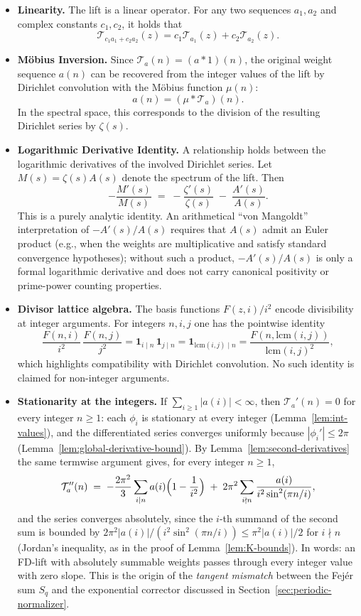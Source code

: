 \begin{itemize}
    \item \textbf{Linearity.} The lift is a linear operator. For any two sequences $a_1, a_2$ and complex constants $c_1, c_2$, it holds that
    \[ \mathcal{T}_{c_1 a_1 + c_2 a_2}(z) = c_1 \mathcal{T}_{a_1}(z) + c_2 \mathcal{T}_{a_2}(z). \]

    \item \textbf{M\"obius Inversion.} Since $\mathcal{T}_a(n) = (a*1)(n)$, the original weight sequence $a(n)$ can be recovered from the integer values of the lift by Dirichlet convolution with the M\"obius function $\mu(n)$:
    \[ a(n) = (\mu * \mathcal{T}_a)(n). \]
    In the spectral space, this corresponds to the division of the resulting Dirichlet series by $\zeta(s)$.

    \item \textbf{Logarithmic Derivative Identity.} A relationship holds between the logarithmic derivatives of the involved Dirichlet series. Let $M(s)=\zeta(s)A(s)$ denote the spectrum of the lift. Then
    \[
    -\frac{M'(s)}{M(s)} \;=\; -\frac{\zeta'(s)}{\zeta(s)} \;-\; \frac{A'(s)}{A(s)}.
    \]
    This is a purely analytic identity. An arithmetical “von Mangoldt” interpretation of $-A'(s)/A(s)$ requires that $A(s)$ admit an Euler product (e.g., when the weights are multiplicative and satisfy standard convergence hypotheses); without such a product, $-A'(s)/A(s)$ is only a formal logarithmic derivative and does not carry canonical positivity or prime-power counting properties.

    \item \textbf{Divisor lattice algebra.} The basis functions $F(z,i)/i^2$ encode divisibility at integer arguments. For integers $n,i,j$ one has the pointwise identity
    \[
    \frac{F(n,i)}{i^2}\,\frac{F(n,j)}{j^2}=\mathbf{1}_{i\mid n}\,\mathbf{1}_{j\mid n}=\mathbf{1}_{\mathrm{lcm}(i,j)\mid n}=\frac{F(n,\mathrm{lcm}(i,j))}{\mathrm{lcm}(i,j)^2},
    \]
    which highlights compatibility with Dirichlet convolution. No such identity is claimed for non-integer arguments.

    \item \textbf{Stationarity at the integers.} If $\sum_{i\ge1}|a(i)|<\infty$, then $\mathcal T_a'(n)=0$ for every integer $n\ge1$: each $\phi_i$ is stationary at every integer (Lemma~\ref{lem:int-values}), and the differentiated series converges uniformly because $|\phi_i'|\le2\pi$ (Lemma~\ref{lem:global-derivative-bound}). By Lemma~\ref{lem:second-derivatives} the same termwise argument gives, for every integer $n\ge1$,
    \[
    \mathcal T_a''(n)\;=\;-\frac{2\pi^2}{3}\sum_{i\mid n}a(i)\Bigl(1-\frac1{i^2}\Bigr)\;+\;2\pi^2\sum_{i\nmid n}\frac{a(i)}{i^2\sin^2(\pi n/i)} ,
    \]
    and the series converges absolutely, since the $i$-th summand of the second sum is bounded by $2\pi^2|a(i)|/(i^2\sin^2(\pi n/i))\le\pi^2|a(i)|/2$ for $i\nmid n$ (Jordan's inequality, as in the proof of Lemma~\ref{lem:K-bounds}). In words: an FD-lift with absolutely summable weights passes through every integer value with zero slope. This is the origin of the \emph{tangent mismatch} between the Fej\'er sum $S_q$ and the exponential corrector discussed in Section~\ref{sec:periodic-normalizer}.
\end{itemize}

